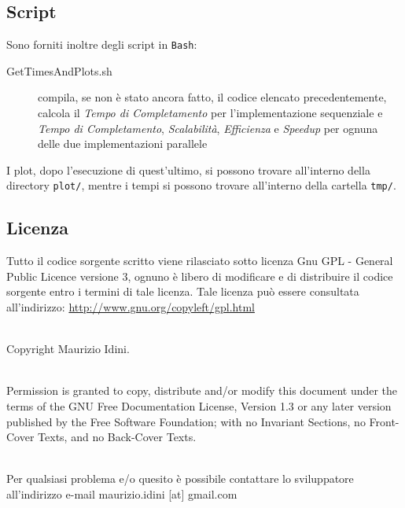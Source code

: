 \documentclass[12pt]{article}
\begin{document}
\subsection{Script}
Sono forniti inoltre degli script in \texttt{Bash}:
\begin{description}
  \item[GetTimesAndPlots.sh] compila, se non \`e stato ancora fatto, il codice elencato precedentemente, calcola il \textit{Tempo di Completamento} per l'implementazione sequenziale e \textit{Tempo di Completamento}, \textit{Scalabilit\`a}, \textit{Efficienza} e \textit{Speedup} per ognuna delle due implementazioni parallele
\end{description}
I plot, dopo l'esecuzione di quest'ultimo, si possono trovare all'interno della directory \texttt{plot/}, mentre i tempi si possono trovare all'interno della cartella \texttt{tmp/}.

\subsection{Licenza}
Tutto il codice sorgente scritto viene rilasciato sotto licenza Gnu GPL - General Public Licence versione 3, ognuno \`e libero di modificare e di distribuire il codice sorgente entro i termini di tale licenza. Tale licenza pu\`o essere consultata all’indirizzo: \url{http://www.gnu.org/copyleft/gpl.html}

\\Copyright {}  Maurizio Idini.

\\Permission is granted to copy, distribute and/or modify this document
under the terms of the GNU Free Documentation License, Version 1.3
or any later version published by the Free Software Foundation;
with no Invariant Sections, no Front-Cover Texts, and no Back-Cover Texts.

\\Per qualsiasi problema e/o quesito \`e possibile contattare lo sviluppatore all'indirizzo e-mail maurizio.idini [at] gmail.com
\end{document}
